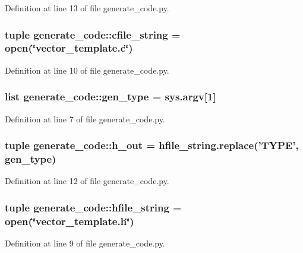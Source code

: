 \-Definition at line 13 of file generate\-\_\-code.\-py.

\hypertarget{namespacegenerate__code_a6d959ddc98e39bfd1559a60ad99d8626}{
\subsubsection[{cfile\-\_\-string}]{\setlength{\rightskip}{0pt plus 5cm}tuple {\bf generate\-\_\-code\-::cfile\-\_\-string} = open(\char`\"{}vector\-\_\-template.\-c\char`\"{})}}\label{namespacegenerate__code_a6d959ddc98e39bfd1559a60ad99d8626}


\-Definition at line 10 of file generate\-\_\-code.\-py.

\hypertarget{namespacegenerate__code_a9e87fddc5c063d2e1bdc2d76b2704051}{
\subsubsection[{gen\-\_\-type}]{\setlength{\rightskip}{0pt plus 5cm}list {\bf generate\-\_\-code\-::gen\-\_\-type} = sys.\-argv\mbox{[}1\mbox{]}}}\label{namespacegenerate__code_a9e87fddc5c063d2e1bdc2d76b2704051}


\-Definition at line 7 of file generate\-\_\-code.\-py.

\hypertarget{namespacegenerate__code_a6f897310b3600cecbc4d8ae2b74dd9c0}{
\subsubsection[{h\-\_\-out}]{\setlength{\rightskip}{0pt plus 5cm}tuple {\bf generate\-\_\-code\-::h\-\_\-out} = hfile\-\_\-string.\-replace('\-T\-Y\-P\-E', {\bf gen\-\_\-type})}}\label{namespacegenerate__code_a6f897310b3600cecbc4d8ae2b74dd9c0}


\-Definition at line 12 of file generate\-\_\-code.\-py.

\hypertarget{namespacegenerate__code_aa76f60e725f6925e2c5588de8a07d8b2}{
\subsubsection[{hfile\-\_\-string}]{\setlength{\rightskip}{0pt plus 5cm}tuple {\bf generate\-\_\-code\-::hfile\-\_\-string} = open(\char`\"{}vector\-\_\-template.\-h\char`\"{})}}\label{namespacegenerate__code_aa76f60e725f6925e2c5588de8a07d8b2}


\-Definition at line 9 of file generate\-\_\-code.\-py.

